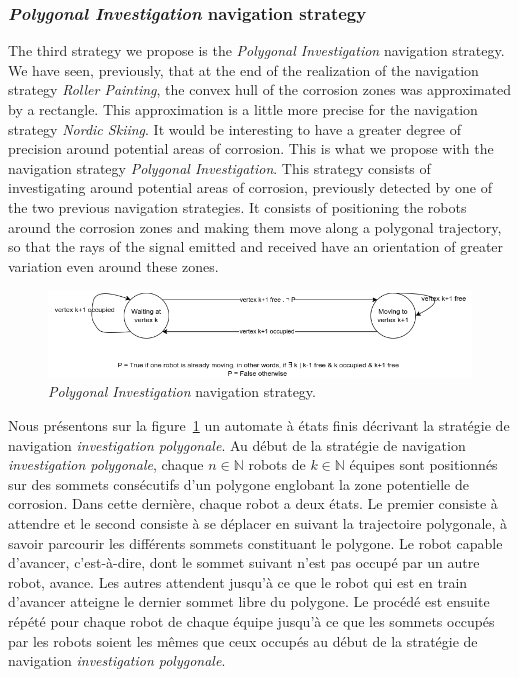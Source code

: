 \documentclass[english,RandD]{rapportPFE}  %
\begin{document}
			\subsubsection*{\textit{Polygonal Investigation} navigation strategy}
				The third strategy we propose is the \textit{Polygonal Investigation} navigation strategy.
				We have seen, previously, that at the end of the realization of the navigation strategy \textit{Roller Painting}, the convex hull of the corrosion zones was approximated by a rectangle.
				This approximation is a little more precise for the navigation strategy \textit{Nordic Skiing}.
				It would be interesting to have a greater degree of precision around potential areas of corrosion.
				This is what we propose with the navigation strategy \textit{Polygonal Investigation}.
				This strategy consists of investigating around potential areas of corrosion, previously detected by one of the two previous navigation strategies.
				It consists of positioning the robots around the corrosion zones and making them move along a polygonal trajectory, so that the rays of the signal emitted and received have an orientation of greater variation even around these zones.

				\begin{figure}[h!]
					\centering
					\includegraphics[scale=0.6]{graphics/automat_poly.png}
					\caption{\textit{Polygonal Investigation} navigation strategy.}
					\label{fig:automat}
				\end{figure}

				Nous présentons sur la figure~\ref{fig:automat} un automate à états finis décrivant la stratégie de navigation \textit{investigation polygonale}.
				Au début de la stratégie de navigation \textit{investigation polygonale}, chaque $n \in \mathbb{N}$ robots de $k \in \mathbb{N}$ équipes sont positionnés sur des sommets consécutifs d'un polygone englobant la zone potentielle de corrosion.
				Dans cette dernière, chaque robot a deux états.
				Le premier consiste à attendre et le second consiste à se déplacer en suivant la trajectoire polygonale, à savoir parcourir les différents sommets constituant le polygone.
				Le robot capable d'avancer, c'est-à-dire, dont le sommet suivant n'est pas occupé par un autre robot, avance.
				Les autres attendent jusqu'à ce que le robot qui est en train d'avancer atteigne le dernier sommet libre du polygone.
				Le procédé est ensuite répété pour chaque robot de chaque équipe jusqu'à ce que les sommets occupés par les robots soient les mêmes que ceux occupés au début de la stratégie de navigation \textit{investigation polygonale}.
\end{document}
